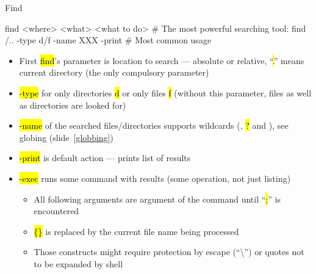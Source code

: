 \documentclass[compress, ucs, xelatex, 11pt, xcolor=svgnames,
  hyperref={
    bookmarks=true,
    unicode=true,
    colorlinks=true,
    pdftitle={Linux, command line and MetaCentrum},
    plainpages=false,
    pdfauthor={Vojtech Zeisek},
    pdfsubject={Course about use of Linux command line, writing shell scripts and using MetaCentrum of CESNET},
    pdfcreator={XeLaTeX},
    pdfkeywords={Linux, GNU, BASH, shell, command line, MetaCentrum},
    linkcolor=DarkRed,
    anchorcolor=DarkBlue,
    citecolor=Indigo,
    filecolor=NavyBlue,
    menucolor=DarkMagenta,
    urlcolor=DarkBlue,
    pdftex},
  url={hyphens, lowtilde} %
  ]{beamer}
\renewcommand{\texttt}[1]{\hl{\ttfamily #1}}
\begin{document}
\begin{frame}[fragile]{Find}
  \begin{bashcode}
    find <where> <what> <what to do> # The most powerful searching tool:
    find /.. -type d/f -name XXX -print # Most common usage
  \end{bashcode}
  \begin{itemize}
    \item First \texttt{find}'s parameter is location to search --- absolute or relative, ``\texttt{.}'' means current directory (the only compulsory parameter)
    \item \texttt{-type} for only directories \texttt{d} or only files \texttt{f} (without this parameter, files as well as directories are looked for)
    \item \texttt{-name} of the searched files/directories supports wildcards (\texttt{*}, \texttt{?} and \texttt{[\ldots]}), see globing (slide~\ref{globbing})
    \item \texttt{-print} is default action --- prints list of results
    \item \texttt{-exec} runs some command with results (some operation, not just listing)
    \begin{itemize}
      \item All following arguments are argument of the command until ``\texttt{;}'' is encountered
      \item \texttt{\{\}} is replaced by the current file name being processed
      \item Those constructs might require protection by escape (``\textbackslash'') or quotes not to be expanded by shell
    \end{itemize}
  \end{itemize}
\end{frame}
\end{document}
